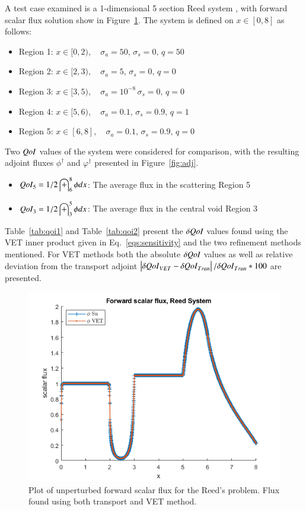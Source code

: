 \documentclass{anstrans}
\newcommand{\sigs}{\sigma_s}
\newcommand{\siga}{\sigma_a}
\newcommand{\qoi}{{\it QoI}\xspace}
\begin{document}
A test case examined is a 1-dimensional 5 section Reed system \cite{ReedProb}, with forward scalar flux solution show in Figure~\ref{fig:Flux4}. The system is defined on  $x \in [0,8]$ as follows:
\begin{itemize}
\item Region 1: $x \in [0,2), \quad \siga=50, \, 			\sigs=0, \, q=50$
\item Region 2: $x \in [2,3), \quad \siga=5, \, 			\sigs=0, \, q=0$
\item Region 3: $x \in [3,5), \quad \siga=10^{-8} \,	\sigs=0, \, q=0$
\item Region 4: $x \in [5,6), \quad \siga=0.1, \, 		\sigs=0.9, \, q=1$
\item Region 5: $x \in [6,8], \quad \siga=0.1, \, 		\sigs=0.9, \, q=0$
\end{itemize}
 Two $\qoi$ values of the system were considered for comparison, with the resulting adjoint fluxes $\phi^\dag$ and $\varphi^\dag$ presented in Figure~\ref{fig:adj}.
 
 \begin{itemize}
\item $\qoi_5 =1/2 \int_6^8 \phi dx $: The average flux in the scattering Region 5

\item $\qoi_3 =1/2 \int_3^5 \phi dx $: The average flux in the central void Region 3
 \end{itemize}

Table~\ref{tab:qoi1} and Table~\ref{tab:qoi2} present the $\delta \qoi$ values found using the VET inner product given in Eq.~\eqref{eqs:sensitivity} and the two refinement methods mentioned. For VET methods both the absolute $\delta \qoi$ values as well as relative deviation from the transport adjoint $ \left| \delta \qoi_{VET} - \delta \qoi_{Tran}\right|/ \delta \qoi_{Tran} * 100$ are presented.



\begin{figure}[H]
 \includegraphics[scale=0.5]{7phi.png}
 \caption{Plot of unperturbed forward scalar flux for the Reed's problem. Flux found using both transport and VET method.}
\label{fig:Flux4}
\end{figure}
\end{document}
